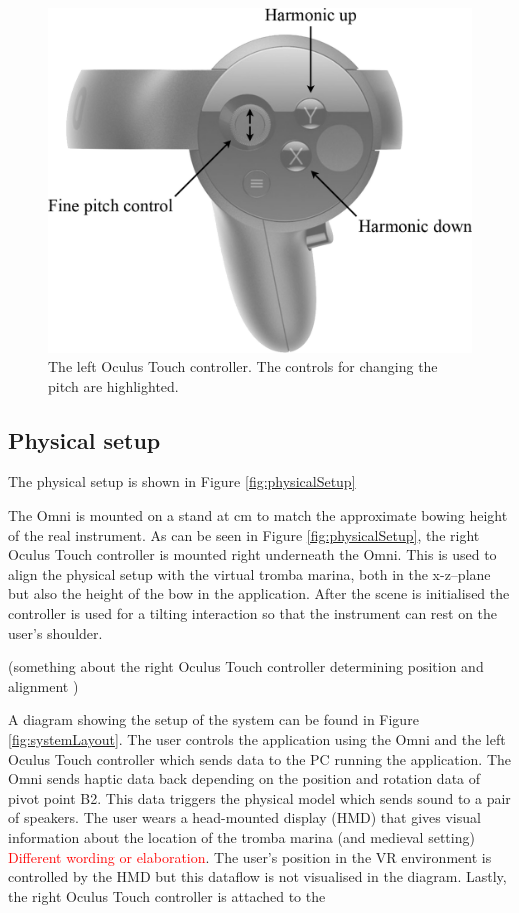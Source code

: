 \documentclass[dvipsnames, pdftex]{article}
\def\SWcomment[#1]{\textcolor{Red}{#1}}
\begin{document}
\begin{figure}[ht]\includegraphics[width=1.0\columnwidth]{SMC 2020 paper template LaTeX/figures/controller.png}
\centering
  \caption{The left Oculus Touch controller. The controls for changing the pitch are highlighted. \label{fig:oculusController}}
\end{figure}
\subsection{Physical setup}\label{subsec:physicalSetup}
The physical setup is shown in Figure \ref{fig:physicalSetup}

The Omni is mounted on a stand at  cm to match the approximate bowing height of the real instrument. As can be seen in Figure \ref{fig:physicalSetup}, the right Oculus Touch controller is mounted right underneath the Omni. This is used to align the physical setup with the virtual tromba marina, both in the x-z--plane but also the height of the bow in the application. After the scene is initialised the controller is used for a tilting interaction so that the instrument can rest on the user's shoulder. 

(something about the right Oculus Touch controller determining position and alignment )

A diagram showing the setup of the system can be found in Figure \ref{fig:systemLayout}. The user controls the application using the Omni and the left Oculus Touch controller which sends data to the PC running the application. The Omni sends haptic data back depending on the position and rotation data of pivot point B2. This data triggers the physical model which sends sound to a pair of speakers. The user wears a head-mounted display (HMD) that gives visual information about the location of the tromba marina (and medieval setting) \SWcomment[Different wording or elaboration]. The user's position in the VR environment is controlled by the HMD but this dataflow is not visualised in the diagram. Lastly, the right Oculus Touch controller is attached to the 
\end{document}

